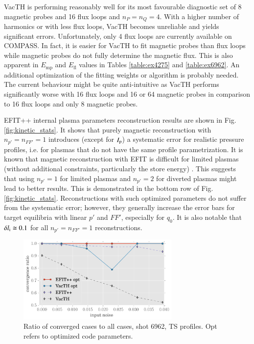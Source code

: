 VacTH is performing reasonably well for its most favourable diagnostic set of 8 magnetic probes and 16 flux loops and $n_P = n_Q = 4$. With a higher number of harmonics or with less flux loops, VacTH becomes unreliable and yields significant errors. Unfortunately, only 4 flux loops are currently available on COMPASS. In fact, it is easier for VacTH to fit magnetic probes than flux loops while magnetic probes do not fully determine the magnetic flux. This is also apparent in $E_\mathrm{mp}$ and $E_\mathrm{fl}$ values in Tables \ref{table:ex4275} and \ref{table:ex6962}. An additional optimization of the fitting weights or algorithm is probably needed. The current behaviour might be quite anti-intuitive as VacTH performs significantly worse with 16 flux loops and 16 or 64 magnetic probes in comparison to 16 flux loops and only 8 magnetic probes. 

EFIT++ internal plasma parameters reconstruction results are shown in Fig. \ref{fig:kinetic_stats}. It shows that purely magnetic reconstruction with $n_{p'}=n_{FF'}=1$ introduces (except for $I_{\rm{p}}$) a systematic error for realistic pressure profiles, i.e. for plasmas that do not have the same profile parametrization. 
It is known that magnetic reconstruction with EFIT is difficult for limited plasmas (without additional constraints, particularly the store energy) \cite{efit1985}.
This suggests that using $n_{p'}=1$ for limited plasmas and $n_{p'}=2$ for diverted plasmas might lead to better results. This is demonstrated in the bottom row of Fig. \ref{fig:kinetic_stats}.
Reconstructions with such optimized parameters do not suffer from the systematic error; however, they generally increase the error bars for target equilibria with linear $p'$ and $FF'$, especially for $q_0$. It is also notable that $\delta l_{\rm{i}} \cong 0.1$ for all $n_{p'}=n_{FF'}=1$ reconstructions.

\begin{figure}
\centering   %
\hfill{}
\includegraphics[width=8cm]{figures/convergence_ratio_6962.pdf}
\hfill{}
\caption{Ratio of converged cases to all cases, shot 6962, TS profiles. Opt refers to optimized code parameters.}
\label{fig:convergence_ratio}
\end{figure}

